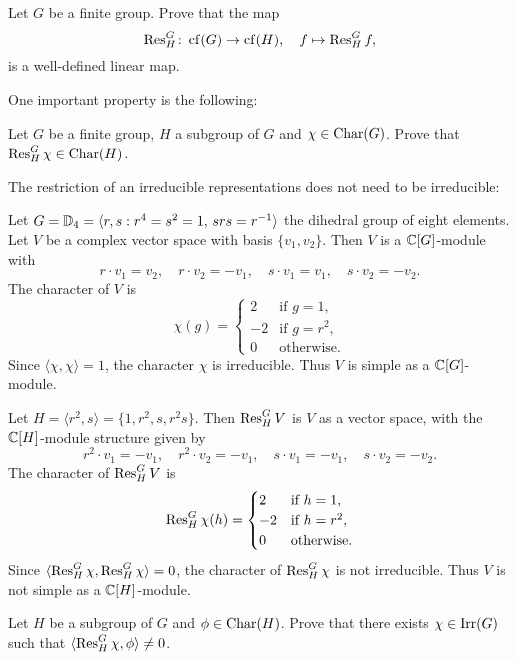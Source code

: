 \begin{exercise}
\label{xca:restriction}
    Let $G$ be a finite group. Prove that
    the map 
    \[
    \operatorname{Res}_H^G\colon\operatorname{cf}(G)\to\operatorname{cf}(H),\quad  f\mapsto\operatorname{Res}_H^G f,
    \]
    is a well-defined linear map. 
\end{exercise}

One important property is the following: 

\begin{exercise}
\label{xca:Res}
Let $G$ be a finite group, $H$ a subgroup of $G$ and $\chi \in \operatorname{Char}(G)$. Prove that $\operatorname{Res}_H^G\chi \in \operatorname{Char}(H)$.
\end{exercise}

The restriction of an irreducible representations
does not need to be irreducible: 

\begin{example}
    Let $G=\mathbb{D}_4=\langle r,s:r^4=s^2=1,\,srs=r^{-1}\rangle$ the dihedral group
    of eight elements. Let $V$ be a complex vector space
    with basis $\{v_1,v_2\}$. Then $V$ is a $\mathbb{C}[G]$-module with 
    \[
    r\cdot v_1=v_2,\quad
    r\cdot v_2=-v_1,\quad
    s\cdot v_1=v_1,\quad
    s\cdot v_2=-v_2.
    \]
    The character of $V$ is 
    \[
    \chi(g)=\begin{cases}
    2 & \text{if $g=1$},\\
    -2 & \text{if $g=r^2$},\\
    0 & \text{otherwise}.
    \end{cases}
    \]
    Since $\langle\chi,\chi\rangle=1$, the character $\chi$ 
    is irreducible. Thus $V$ is simple as a $\mathbb{C}[G]$-module. 
    
    Let  
    $H=\langle r^2,s\rangle=\{1,r^2,s,r^2s\}$. Then  $\operatorname{Res}_H^GV$ is $V$ as a vector space, with
    the $\mathbb{C}[H]$-module structure given by 
    \[
    r^2\cdot v_1=-v_1,\quad
    r^2\cdot v_2=-v_1,\quad
    s\cdot v_1=-v_1,\quad
    s\cdot v_2=-v_2.
    \]
    The character of $\operatorname{Res}_H^GV$ is
    \[
    \operatorname{Res}_H^G\chi(h)
    =\begin{cases}
    2 & \text{if $h=1$},\\
    -2 & \text{if $h=r^2$},\\
    0 & \text{otherwise}.
    \end{cases}
    \]
    Since $\langle\operatorname{Res}_H^G\chi,\operatorname{Res}_H^G\chi\rangle=0$, 
    the character of $\operatorname{Res}_H^G\chi$ is not irreducible. Thus $V$ 
    is not simple as a $\mathbb{C}[H]$-module. 
\end{example}

\begin{exercise}
\label{xca:constituent_restriction}
    Let $H$ be a subgroup of $G$ and 
    $\phi\in\operatorname{Char}(H)$. Prove that there exists 
    $\chi\in\operatorname{Irr}(G)$ such that
    $\langle\operatorname{Res}_H^G\chi,\phi\rangle\ne 0$.
\end{exercise}

